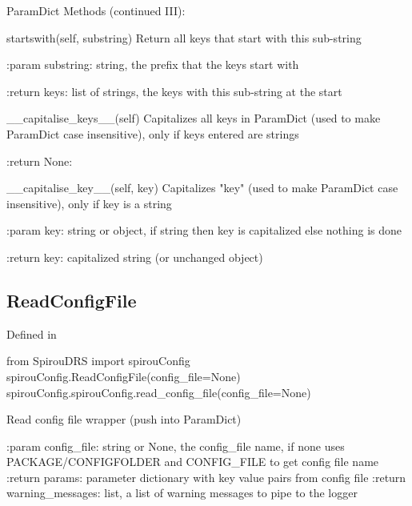 \noindent\begin{minipage}{\textwidth}
\begin{pythondocstring}
ParamDict Methods (continued III):

	startswith(self, substring)
	        Return all keys that start with this sub-string

	        :param substring: string, the prefix that the keys start with

	        :return keys: list of strings, the keys with this sub-string at the start

	__capitalise_keys__(self)
	        Capitalizes all keys in ParamDict (used to make ParamDict case
	        insensitive), only if keys entered are strings

	        :return None:

	__capitalise_key__(self, key)
        Capitalizes "key" (used to make ParamDict case insensitive), only if
        key is a string

        :param key: string or object, if string then key is capitalized else
                    nothing is done

        :return key: capitalized string (or unchanged object)

\end{pythondocstring}
\end{minipage}

\noindent\begin{minipage}{\textwidth}
\subsection{ReadConfigFile}

Defined in \spirouConfig{}

\begin{pythonbox}
from SpirouDRS import spirouConfig
spirouConfig.ReadConfigFile(config_file=None)
spirouConfig.spirouConfig.read_config_file(config_file=None)
\end{pythonbox}

\begin{pythondocstring}
Read config file wrapper (push into ParamDict)

:param config_file: string or None, the config_file name, if none uses
                    PACKAGE/CONFIGFOLDER and CONFIG_FILE to get config
                    file name
:return params: parameter dictionary with key value pairs from config file
:return warning_messages: list, a list of warning messages to pipe to the logger
\end{pythondocstring}
\end{minipage}

